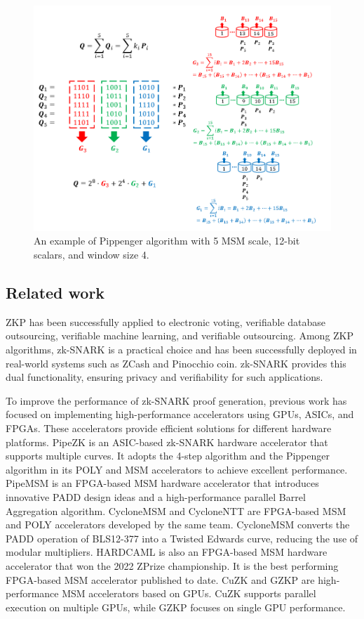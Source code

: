 \documentclass[journal=tches,final]{iacrtrans}
\begin{document}
\begin{figure}[h]
\label{fig:pippenger}
\centering
\includegraphics[width=1\linewidth]{image/example-pippenger.png}
\caption{An example of Pippenger algorithm with 5 MSM scale, 12-bit scalars, and window size 4.}
\end{figure}

\subsection{Related work}
\todo{}
ZKP has been successfully applied to electronic voting, verifiable database outsourcing, verifiable machine learning, and verifiable outsourcing. Among ZKP algorithms, zk-SNARK is a practical choice and has been successfully deployed in real-world systems such as ZCash and Pinocchio coin. zk-SNARK provides this dual functionality, ensuring privacy and verifiability for such applications. 

To improve the performance of zk-SNARK proof generation, previous work has focused on implementing high-performance accelerators using GPUs, ASICs, and FPGAs. These accelerators provide efficient solutions for different hardware platforms. PipeZK is an ASIC-based zk-SNARK hardware accelerator that supports multiple curves. It adopts the 4-step algorithm and the Pippenger algorithm in its POLY and MSM accelerators to achieve excellent performance. PipeMSM is an FPGA-based MSM hardware accelerator that introduces innovative PADD design ideas and a high-performance parallel Barrel Aggregation algorithm. CycloneMSM and CycloneNTT are FPGA-based MSM and POLY accelerators developed by the same team. CycloneMSM converts the PADD operation of BLS12-377 into a Twisted Edwards curve, reducing the use of modular multipliers. HARDCAML is also an FPGA-based MSM hardware accelerator that won the 2022 ZPrize championship. It is the best performing FPGA-based MSM accelerator published to date. CuZK and GZKP are high-performance MSM accelerators based on GPUs. CuZK supports parallel execution on multiple GPUs, while GZKP focuses on single GPU performance.
\end{document}
